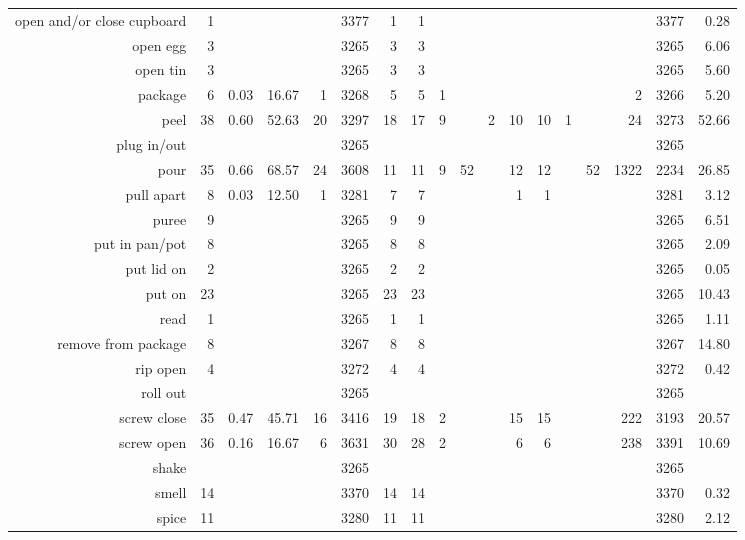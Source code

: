 \begin{tabular}{r r r@{\ \ }r@{\ \ }r@{\ \ }r@{\ \ }r r@{\ \ }r@{\ \ }r@{\ \ }r@{\ \ }r@{\ \ }r@{\ \ }r@{\ \ }r@{\ \ }r@{\ \ }r r}
open and/or close cupboard & 1 &  &  &  & 3377 & 1 & 1 &  &  &  &  &  &  &  &  & 3377 & 0.28 \\
open egg & 3 &  &  &  & 3265 & 3 & 3 &  &  &  &  &  &  &  &  & 3265 & 6.06 \\
open tin & 3 &  &  &  & 3265 & 3 & 3 &  &  &  &  &  &  &  &  & 3265 & 5.60 \\
package & 6 & 0.03 & 16.67 & 1 & 3268 & 5 & 5 & 1 &  &  &  &  &  &  & 2 & 3266 & 5.20 \\
peel & 38 & 0.60 & 52.63 & 20 & 3297 & 18 & 17 & 9 &  & 2 & 10 & 10 & 1 &  & 24 & 3273 & 52.66 \\
plug in/out &  &  &  &  & 3265 &  &  &  &  &  &  &  &  &  &  & 3265 &  \\
pour & 35 & 0.66 & 68.57 & 24 & 3608 & 11 & 11 & 9 & 52 &  & 12 & 12 &  & 52 & 1322 & 2234 & 26.85 \\
pull apart & 8 & 0.03 & 12.50 & 1 & 3281 & 7 & 7 &  &  &  & 1 & 1 &  &  &  & 3281 & 3.12 \\
puree & 9 &  &  &  & 3265 & 9 & 9 &  &  &  &  &  &  &  &  & 3265 & 6.51 \\
put in pan/pot & 8 &  &  &  & 3265 & 8 & 8 &  &  &  &  &  &  &  &  & 3265 & 2.09 \\
put lid on & 2 &  &  &  & 3265 & 2 & 2 &  &  &  &  &  &  &  &  & 3265 & 0.05 \\
put on & 23 &  &  &  & 3265 & 23 & 23 &  &  &  &  &  &  &  &  & 3265 & 10.43 \\
read & 1 &  &  &  & 3265 & 1 & 1 &  &  &  &  &  &  &  &  & 3265 & 1.11 \\
remove from package & 8 &  &  &  & 3267 & 8 & 8 &  &  &  &  &  &  &  &  & 3267 & 14.80 \\
rip open & 4 &  &  &  & 3272 & 4 & 4 &  &  &  &  &  &  &  &  & 3272 & 0.42 \\
roll out &  &  &  &  & 3265 &  &  &  &  &  &  &  &  &  &  & 3265 &  \\
screw close & 35 & 0.47 & 45.71 & 16 & 3416 & 19 & 18 & 2 &  &  & 15 & 15 &  &  & 222 & 3193 & 20.57 \\
screw open & 36 & 0.16 & 16.67 & 6 & 3631 & 30 & 28 & 2 &  &  & 6 & 6 &  &  & 238 & 3391 & 10.69 \\
shake &  &  &  &  & 3265 &  &  &  &  &  &  &  &  &  &  & 3265 &  \\
smell & 14 &  &  &  & 3370 & 14 & 14 &  &  &  &  &  &  &  &  & 3370 & 0.32 \\
spice & 11 &  &  &  & 3280 & 11 & 11 &  &  &  &  &  &  &  &  & 3280 & 2.12 \\

\end{tabular}
